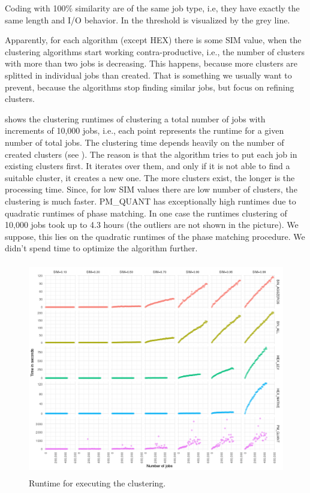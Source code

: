 \documentclass[]{llncs}
\begin{document}
Coding with 100$\%$  similarity are of the same job type, i.e, they have exactly the same length and I/O behavior.
In  the threshold is visualized by the grey line.


Apparently, for each algorithm (except HEX) there is some SIM value, when the clustering algorithms start working contra-productive, i.e., the number of clusters with more than two jobs is decreasing.
This happens, because more clusters are splitted in individual jobs than created.
That is something we usually want to prevent, because the algorithms stop finding similar jobs, but focus on refining clusters.

 shows the clustering runtimes of clustering a total number of jobs with increments of 10,000 jobs, i.e., each point represents the runtime for a given number of total jobs.
The clustering time depends heavily on the number of created clusters (see ).
The reason is that the algorithm tries to put each job in existing clusters first.
It iterates over them, and only if it is not able to find a suitable cluster, it creates a new one.
The more clusters exist, the longer is the processing time.
Since, for low SIM values there are low number of clusters, the clustering is much faster.
PM\_QUANT has exceptionally high runtimes due to quadratic runtimes of phase matching.
In one case the runtimes clustering of 10,000 jobs took up to 4.3 hours (the outliers are not shown in the picture).
We suppose, this lies on the quadratic runtimes of the phase matching procedure.
We didn’t spend time to optimize the algorithm further.

\begin{figure}
  \centering
  \includegraphics[width=4.61in,height=3.68in]{./media/image18.png}
  \caption{Runtime for executing the clustering.}
  \label{fig:alg_runtimes}
\end{figure}
\end{document}
